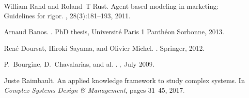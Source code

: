 \documentclass[runningheads,a4paper]{llncs}
\begin{document}
\begin{thebibliography}{10}
William Rand and Roland~T Rust.
\newblock Agent-based modeling in marketing: Guidelines for rigor.
, 28(3):181--193,
  2011.

Arnaud Banos.
.
\newblock PhD thesis, Universit{\'e} Paris 1 Panth{\'e}on Sorbonne, 2013.

Ren{\'e} Doursat, Hiroki Sayama, and Olivier Michel.
.
\newblock Springer, 2012.

P.~{Bourgine}, D.~{Chavalarias}, and al.
.
, July 2009.

Juste Raimbault.
\newblock An applied knowledge framework to study complex systems.
\newblock In {\em Complex Systems Design \& Management}, pages 31--45, 2017.

\end{thebibliography}
\end{document}
